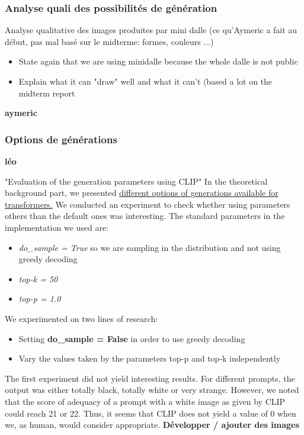 \documentclass{article}
\begin{document}
\subsubsection{Analyse quali des possibilités de génération}
Analyse qualitative des images produites par mini dalle (ce qu'Aymeric a fait au début, pas mal basé sur le midterme: formes, couleurs ...)

\begin{itemize}
    \item State again that we are using minidalle because the whole dalle is not public
    \item Explain what it can "draw" well and what it can't (based a lot on the midterm report
\end{itemize}
\textbf{aymeric}

\subsubsection{Options de générations}
\textbf{léo}

"Evaluation of the generation parameters using CLIP"
In the theoretical background part, we presented \hyperlink{options-generation}{different options of generations available for transformers.} We conducted an experiment to check whether using parameters others than the default ones was interesting. The standard parameters in the implementation we used are:
\begin{itemize}
    \item \textit{do\_sample = True} so we are sampling in the distribution and not using greedy decoding
    \item \textit{top-k = 50}
    \item \textit{top-p = 1.0}
\end{itemize}

We experimented on two lines of research:
\begin{itemize}
    \item Setting \textbf{do\_sample = False} in order to use greedy decoding
    \item Vary the values taken by the parameters top-p and top-k independently
\end{itemize}

The first experiment did not yield interesting results. For different prompts, the output was either totally black, totally white or very strange. However, we noted that the score of adequacy of a prompt with a white image as given by CLIP could reach 21 or 22. Thus, it seems that CLIP does not yield a value of 0 when we, as human, would consider appropriate. \textbf{Développer / ajouter des images}
\end{document}

